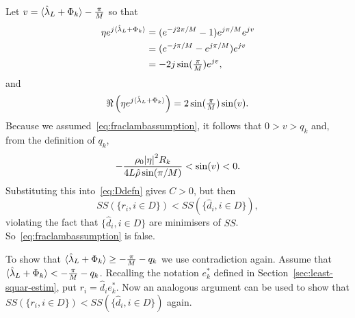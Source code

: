 \documentclass[journal]{IEEEtran}
\begin{document}
\begin{IEEEproof}
Let $v = \langle \hat{\lambda}_L + \Phi_k \rangle - \tfrac{\pi}{M}$ so that
\begin{align*}
\eta e^{j\langle \hat{\lambda}_L + \Phi_k \rangle} &= (e^{-j2\pi/M} - 1) e^{j \pi/M} e^{jv} \\
&= (e^{-j\pi/M} - e^{j\pi/M}) e^{jv} \\
&= -2 j \sin(\tfrac{\pi}{M}) e^{j v },
\end{align*}
and
\[
\Re\left( \eta e^{j\langle \hat{\lambda}_L + \Phi_k \rangle}\right) = 2 \sin(\tfrac{\pi}{M}) \sin(v).
\]
Because we assumed~\eqref{eq:fraclambassumption}, it follows that $0 > v > q_k$ and, from the definition of $q_k$,
\[
 -\frac{\rho_0 {\vert \eta \vert}^2 R_k}{4 L \hat{\rho} \sin(\pi/M)} <  \sin(v) < 0.
\]
Substituting this into~\eqref{eq:Ddefn} gives $C > 0$, but then 
\[
SS(\{r_i, i \in D\}) < SS(\{\hat{d}_i, i \in D\}),
\] 
violating the fact that $\{\hat{d}_i, i \in D\}$ are minimisers of $SS$.  So~\eqref{eq:fraclambassumption} is false.

To show that $\langle \hat{\lambda}_L + \Phi_k \rangle \geq -\frac{\pi}{M} - q_k$ we use contradiction again.  Assume that $\langle \hat{\lambda}_L + \Phi_k \rangle < -\frac{\pi}{M} - q_k$.  Recalling the notation $e_k^*$ defined in Section~\ref{sec:least-squar-estim}, put $r_i = \hat{d}_i e_k^*$.  Now an analogous argument can be used to show that $SS(\{r_i, i \in D\}) < SS(\{\hat{d}_i, i \in D\})$ again.
\end{IEEEproof}
\end{document}
